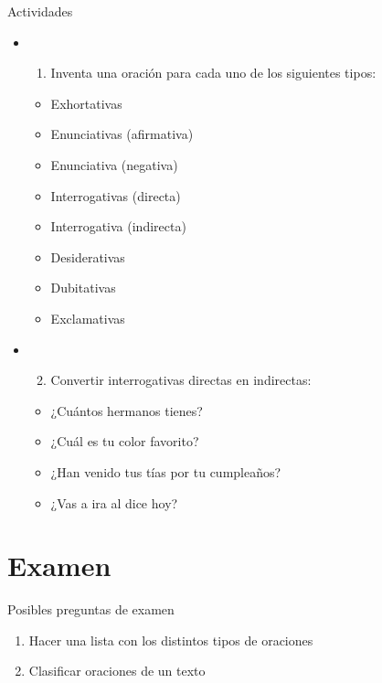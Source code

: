 \documentclass[ignorenonframetext,]{beamer}
\providecommand{\tightlist}{%
  \setlength{\itemsep}{0pt}\setlength{\parskip}{0pt}}
\begin{document}
\begin{frame}{Actividades}
\protect\hypertarget{actividades-1}{}

\begin{itemize}
\item
  \begin{enumerate}
  \tightlist
  \item
    Inventa una oración para cada uno de los siguientes tipos:
  \end{enumerate}

  \begin{itemize}
  \tightlist
  \item
    Exhortativas
  \item
    Enunciativas (afirmativa)
  \item
    Enunciativa (negativa)
  \item
    Interrogativas (directa)
  \item
    Interrogativa (indirecta)
  \item
    Desiderativas
  \item
    Dubitativas
  \item
    Exclamativas
  \end{itemize}
\item
  \begin{enumerate}
  \setcounter{enumi}{1}
  \tightlist
  \item
    Convertir interrogativas directas en indirectas:
  \end{enumerate}

  \begin{itemize}
  \tightlist
  \item
    ¿Cuántos hermanos tienes?
  \item
    ¿Cuál es tu color favorito?
  \item
    ¿Han venido tus tías por tu cumpleaños?
  \item
    ¿Vas a ira al dice hoy?
  \end{itemize}
\end{itemize}

\end{frame}

\hypertarget{examen}{%
\section{Examen}\label{examen}}

\begin{frame}{Posibles preguntas de examen}
\protect\hypertarget{posibles-preguntas-de-examen}{}

\begin{enumerate}
\tightlist
\item
  Hacer una lista con los distintos tipos de oraciones
\item
  Clasificar oraciones de un texto
\end{enumerate}

\end{frame}
\end{document}
